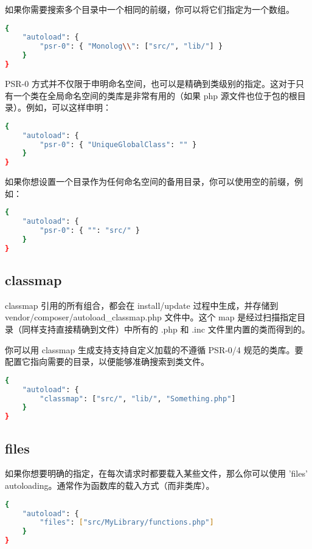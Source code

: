 如果你需要搜索多个目录中一个相同的前缀，你可以将它们指定为一个数组。

\begin{lstlisting}[language=bash]
{
    "autoload": {
        "psr-0": { "Monolog\\": ["src/", "lib/"] }
    }
}
\end{lstlisting}

PSR-0 方式并不仅限于申明命名空间，也可以是精确到类级别的指定。这对于只有一个类在全局命名空间的类库是非常有用的（如果 php 源文件也位于包的根目录）。例如，可以这样申明：

\begin{lstlisting}[language=bash]
{
    "autoload": {
        "psr-0": { "UniqueGlobalClass": "" }
    }
}
\end{lstlisting}

如果你想设置一个目录作为任何命名空间的备用目录，你可以使用空的前缀，例如：


\begin{lstlisting}[language=bash]
{
    "autoload": {
        "psr-0": { "": "src/" }
    }
}
\end{lstlisting}

\subsection{classmap}

classmap 引用的所有组合，都会在 install/update 过程中生成，并存储到 vendor/composer/autoload\_classmap.php 文件中。这个 map 是经过扫描指定目录（同样支持直接精确到文件）中所有的 .php 和 .inc 文件里内置的类而得到的。

你可以用 classmap 生成支持支持自定义加载的不遵循 PSR-0/4 规范的类库。要配置它指向需要的目录，以便能够准确搜索到类文件。

\begin{lstlisting}[language=bash]
{
    "autoload": {
        "classmap": ["src/", "lib/", "Something.php"]
    }
}
\end{lstlisting}


\subsection{files}


如果你想要明确的指定，在每次请求时都要载入某些文件，那么你可以使用 'files' autoloading。通常作为函数库的载入方式（而非类库）。

\begin{lstlisting}[language=bash]
{
    "autoload": {
        "files": ["src/MyLibrary/functions.php"]
    }
}
\end{lstlisting}

